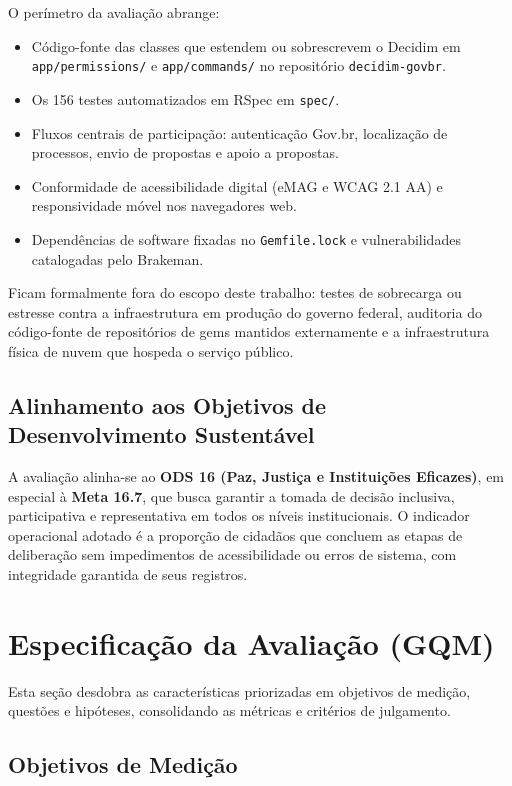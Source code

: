 \documentclass[journal]{IEEEtran}
\begin{document}
O perímetro da avaliação abrange:
\begin{itemize}
    \item Código-fonte das classes que estendem ou sobrescrevem o Decidim em \texttt{app/permissions/} e \texttt{app/commands/} no repositório \texttt{decidim-govbr}.
    \item Os 156 testes automatizados em RSpec em \texttt{spec/}.
    \item Fluxos centrais de participação: autenticação Gov.br, localização de processos, envio de propostas e apoio a propostas.
    \item Conformidade de acessibilidade digital (eMAG e WCAG 2.1 AA) e responsividade móvel nos navegadores web.
    \item Dependências de software fixadas no \texttt{Gemfile.lock} e vulnerabilidades catalogadas pelo Brakeman.
\end{itemize}

Ficam formalmente fora do escopo deste trabalho: testes de sobrecarga ou estresse contra a infraestrutura em produção do governo federal, auditoria do código-fonte de repositórios de gems mantidos externamente e a infraestrutura física de nuvem que hospeda o serviço público.

\subsection{Alinhamento aos Objetivos de Desenvolvimento Sustentável}
\label{sec:ods}

A avaliação alinha-se ao \textbf{ODS 16 (Paz, Justiça e Instituições Eficazes)}, em especial à \textbf{Meta 16.7}, que busca garantir a tomada de decisão inclusiva, participativa e representativa em todos os níveis institucionais. O indicador operacional adotado é a proporção de cidadãos que concluem as etapas de deliberação sem impedimentos de acessibilidade ou erros de sistema, com integridade garantida de seus registros.

\section{Especificação da Avaliação (GQM)}
\label{sec:fase2}

Esta seção desdobra as características priorizadas em objetivos de medição, questões e hipóteses, consolidando as métricas e critérios de julgamento.

\subsection{Objetivos de Medição}
\label{sec:objetivos}
\end{document}

